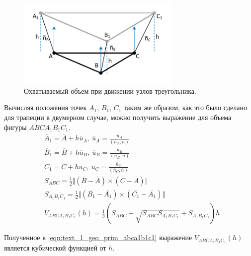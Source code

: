 \begin{figure}[ht]
	\centering
	\includegraphics[width=0.7\textwidth]{./pics/text_1_geo_prim/pyramid_partial.pdf}
	\caption{Охватываемый объем при движении узлов треугольника.}
	\label{fig:text_1_geo_prim_pyramid_partial}
\end{figure}

Вычисляя положения точек $A_1$, $B_1$, $C_1$ таким же образом, как это было сделано для трапеции в двумерном случае, можно получить выражение для объема фигуры $ABCA_1B_1C_1$.
\begin{equation}\label{eqn:text_1_geo_prim_abca1b1c1}
	\begin{aligned}
		& \overline{A}_1 = \overline{A} + h \overline{u}_A, \ \overline{u}_A = \frac{\overline{n}_A}{(\overline{n}_A, \overline{n})} \\
		& \overline{B}_1 = \overline{B} + h \overline{u}_B, \ \overline{u}_B = \frac{\overline{n}_B}{(\overline{n}_B, \overline{n})} \\
		& \overline{C}_1 = \overline{C} + h \overline{u}_C, \ \overline{u}_C = \frac{\overline{n}_C}{(\overline{n}_C, \overline{n})} \\
		& S_{ABC} = \frac{1}{2} \Vert (\overline{B} - \overline{A}) \times (\overline{C} - \overline{A}) \Vert \\
		& S_{A_1B_1C_1} = \frac{1}{2} \Vert (\overline{B_1} - \overline{A_1}) \times (\overline{C_1} - \overline{A_1}) \Vert \\
		& V_{ABCA_1B_1C_1}(h) = \frac{1}{3} \left( S_{ABC} + \sqrt{S_{ABC} S_{A_1B_1C_1}} + S_{A_1B_1C_1} \right) h
	\end{aligned}
\end{equation}

Полученное в \eqref{eqn:text_1_geo_prim_abca1b1c1} выражение $V_{ABCA_1B_1C_1}(h)$ является кубической функцией от $h$.
